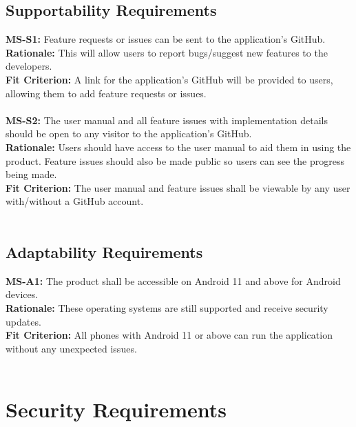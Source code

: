 \documentclass[12pt]{article}
\begin{document}
\subsection{Supportability Requirements}
  \textbf{MS-S1:} Feature requests or issues can be sent to the application's GitHub.\\
  \textbf{Rationale:} This will allow users to report bugs/suggest new features to the developers.\\
  \textbf{Fit Criterion:} A link for the application's GitHub will be provided to users, allowing them to add feature requests or issues.\\\\
  \textbf{MS-S2:} The user manual and all feature issues with implementation details should be open to any visitor to the application's GitHub.\\
  \textbf{Rationale:} Users should have access to the user manual to aid them in using the product. Feature issues should also be made public so users can see the progress being made.\\
  \textbf{Fit Criterion:} The user manual and feature issues shall be viewable by any user with/without a GitHub account.\\\\

\subsection{Adaptability Requirements}
  \textbf{MS-A1:} The product shall be accessible on Android 11 and above for Android devices.\\
  \textbf{Rationale:} These operating systems are still supported and receive security updates.\\
  \textbf{Fit Criterion:} All phones with Android 11 or above can run the application without any unexpected issues.\\\\

\section{Security Requirements}
\end{document}
